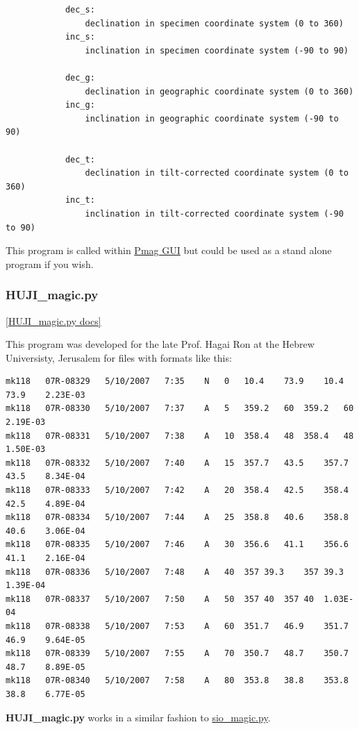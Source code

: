 \documentclass[11pt]{book}
\begin{document}
{{\begin{verbatim}
            dec_s:
                declination in specimen coordinate system (0 to 360)
            inc_s:
                inclination in specimen coordinate system (-90 to 90)

            dec_g:
                declination in geographic coordinate system (0 to 360)
            inc_g:
                inclination in geographic coordinate system (-90 to 90)

            dec_t:
                declination in tilt-corrected coordinate system (0 to 360)
            inc_t:
                inclination in tilt-corrected coordinate system (-90 to 90)
 \end{verbatim}

 This program is called within \href{#pmag_gui.py}{Pmag GUI} but could be used as a stand alone program if you wish.





\subsubsection{HUJI\_magic.py}
\href{https://github.com/PmagPy/PmagPy/blob/master/programs/HUJI_magic.py}{[HUJI\_magic.py docs]}

This program was developed for the late Prof.  Hagai Ron at the Hebrew Universisty, Jerusalem for files with formats like this:


\begin{verbatim}
mk118	07R-08329	5/10/2007	7:35	N	0	10.4	73.9	10.4	73.9	2.23E-03
mk118	07R-08330	5/10/2007	7:37	A	5	359.2	60	359.2	60	2.19E-03
mk118	07R-08331	5/10/2007	7:38	A	10	358.4	48	358.4	48	1.50E-03
mk118	07R-08332	5/10/2007	7:40	A	15	357.7	43.5	357.7	43.5	8.34E-04
mk118	07R-08333	5/10/2007	7:42	A	20	358.4	42.5	358.4	42.5	4.89E-04
mk118	07R-08334	5/10/2007	7:44	A	25	358.8	40.6	358.8	40.6	3.06E-04
mk118	07R-08335	5/10/2007	7:46	A	30	356.6	41.1	356.6	41.1	2.16E-04
mk118	07R-08336	5/10/2007	7:48	A	40	357	39.3	357	39.3	1.39E-04
mk118	07R-08337	5/10/2007	7:50	A	50	357	40	357	40	1.03E-04
mk118	07R-08338	5/10/2007	7:53	A	60	351.7	46.9	351.7	46.9	9.64E-05
mk118	07R-08339	5/10/2007	7:55	A	70	350.7	48.7	350.7	48.7	8.89E-05
mk118	07R-08340	5/10/2007	7:58	A	80	353.8	38.8	353.8	38.8	6.77E-05
\end{verbatim}

   {\bf HUJI\_magic.py}  works in a similar fashion to \href{#sio_magic.py}{sio\_magic.py}.


}}
\end{document}
